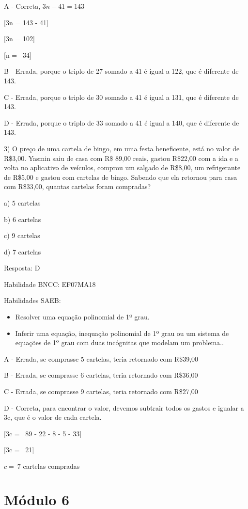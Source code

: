 A - Correta, \(3n + 41 = 143\)

[3n = 143 - 41]

[3n = 102]

[n = \ 34]

B - Errada, porque o triplo de 27 somado a 41 é igual a 122, que é
diferente de 143.

C - Errada, porque o triplo de 30 somado a 41 é igual a 131, que é
diferente de 143.

D - Errada, porque o triplo de 33 somado a 41 é igual a 140, que é
diferente de 143.

3) O preço de uma cartela de bingo, em uma festa beneficente, está no
valor de R\$3,00. Yasmin saiu de casa com R\$ 89,00 reais, gastou
R\$22,00 com a ida e a volta no aplicativo de veículos, comprou um
salgado de R\$8,00, um refrigerante de R\$5,00 e gastou com cartelas de
bingo. Sabendo que ela retornou para casa com R\$33,00, quantas cartelas
foram compradas?

a) 5 cartelas

b) 6 cartelas

c) 9 cartelas

d) 7 cartelas

Resposta: D

Habilidade BNCC: EF07MA18

Habilidades SAEB:

\begin{itemize}
\item
  Resolver uma equação polinomial de 1º grau.
\item
  Inferir uma equação, inequação polinomial de 1º grau ou um sistema de
  equações de 1º grau com duas incógnitas que modelam um problema..
\end{itemize}

A - Errada, se comprasse 5 cartelas, teria retornado com R\$39,00

B - Errada, se comprasse 6 cartelas, teria retornado com R\$36,00

C - Errada, se comprasse 9 cartelas, teria retornado com R\$27,00

D - Correta, para encontrar o valor, devemos subtrair todos os gastos e
igualar a 3c, que é o valor de cada cartela.

[3c = \ 89 - 22 - 8 - 5 - 33]

[3c = \ 21]

\(c = \ 7\) cartelas compradas

\section{Módulo 6}

